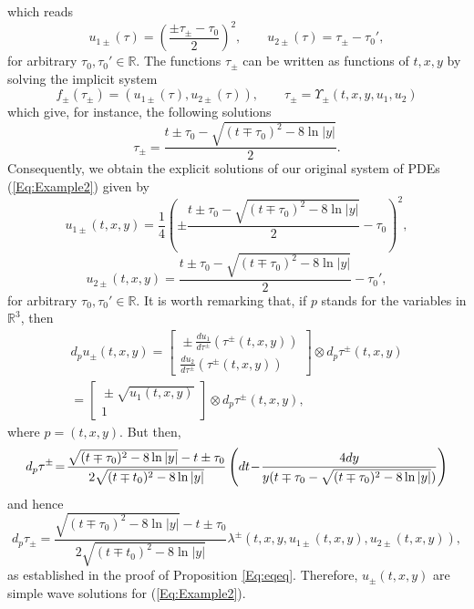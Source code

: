 \documentclass{birkjour}
\theoremstyle{definition}
\theoremstyle{remark}
\numberwithin{equation}{section}
\numberwithin{equation}{section}
\numberwithin{thm}{section}
\numberwithin{equation}{section}
\numberwithin{thm}{section}
\begin{document}
which reads
$$
u_{1\pm}(\tau)=\left(\frac{\pm\tau_\pm-\tau_0}2\right)^2,\qquad u_{2\pm}(\tau)=\tau_\pm-\tau_0',
$$
for arbitrary $\tau_0,\tau_0'\in \mathbb{R}$.
The functions $\tau_\pm$ can be written as  functions of $t,x,y$ by solving the implicit system
$$
f_\pm(\tau_\pm)=(u_{1\pm}(\tau),u_{2\pm}(\tau)),\qquad \tau_\pm=\Upsilon_\pm(t,x,y,u_1,u_2)
$$
which give, for instance, the following solutions
$$
\tau_{\pm}=\frac{t\pm \tau_0-\sqrt{(t\mp\tau_0)^2-8\ln|y|}}{2}.
$$
Consequently, we obtain the explicit solutions of our original system of PDEs (\ref{Eq:Example2}) given by
$$
u_{1\pm}(t,x,y)=\frac{1}{4}\left(\pm\frac{ t\pm\tau_0-\sqrt{( t\mp\tau_0)^2-8\ln|y|}}{2}-\tau_0\right)^2,
$$
$$u_{2\pm}(t,x,y)=\frac{ t\pm\tau_0-\sqrt{( t\mp\tau_0)^2-8\ln|y|}}{2}-\tau_0',
$$
for arbitrary $\tau_0,\tau_0'\in \mathbb{R}$. 
It is worth remarking that, if $p$ stands for the variables in $\mathbb{R}^3$, then
\begin{multline*}
	d_{p}u_\pm(t,x,y)\!\!=\!\!\left[\begin{array}{c}\!\!\pm\frac{du_1}{d\tau^\pm}(\tau^\pm(t,x,y))\\\!\!\frac{du_2}{d\tau^\pm}(\tau^\pm(t,x,y))\end{array}\right]\otimes d_p\tau^\pm(t,x,y)\\=\!\left[\begin{array}{c}\!\!\pm\sqrt{u_1(t,x,y)}\\1\end{array}\right]\otimes d_p\tau^\pm(t,x,y),
\end{multline*}
where $p=(t,x,y)$. But then,
$$
{\small d_p\tau^\pm\!=\!\frac{\sqrt{(t\mp \tau_0)^2-8\ln |y|}-t\pm\tau_0}{2\sqrt{( t\mp t_0)^2-8\ln|y|}}\left(dt\!-\!\frac{4dy}{y( t\mp \tau_0-\sqrt{(t\mp\tau_0)^2-8\ln |y|})}\right)}
$$
and hence
$$
d_p \tau_\pm=\frac{\sqrt{(t\mp \tau_0)^2-8\ln |y|}-t\pm\tau_0}{2\sqrt{( t\mp t_0)^2-8\ln|y|}}\lambda^\pm(t,x,y,u_{1\pm}(t,x,y),u_{2\pm}(t,x,y)),
$$
as established in the proof of Proposition \ref{Eq:eqeq}. Therefore, $u_\pm(t,x,y)$ are simple wave solutions for (\ref{Eq:Example2}).  
\end{document}
